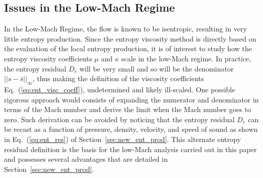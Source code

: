 \documentclass[preprint,10pt]{elsarticle}
\newcommand{\eqt}[1]{Eq.~(\ref{#1})}                     %
\newcommand{\sct}[1]{Section~\ref{#1}}                   %
\begin{document}
\subsection{Issues in the Low-Mach Regime} 

In the Low-Mach Regime, the flow is known to be isentropic, resulting in very little entropy production. Since the entropy viscosity method is directly based on the evaluation of the local entropy production, it is of interest to study how the entropy viscosity coefficients $\mu$ and $\kappa$ scale in the low-Mach regime. In practice, the entropy residual $D_e$ will be very small and so will be the denominator $|| s - \bar{s} ||_{\infty}$, thus making the definition of the viscosity coefficients \eqt{eq:ent_visc_coeff}, undetermined and likely ill-scaled.  One possible rigorous approach would consists of expanding the numerator and denominator in terms of the Mach number and derive the limit when the Mach number goes to zero. Such derivation can be avoided by noticing that the entropy residual $D_e$ can be recast as a function of pressure, density, velocity, and speed of sound as shown in \eqt{eq:ent_res} of \sct{sec:new_ent_prod}. This alternate entropy residual definition is the basis for the low-Mach analysis carried out in this paper and possesses several advantages that are detailed in \sct{sec:new_ent_prod}.

\end{document}

